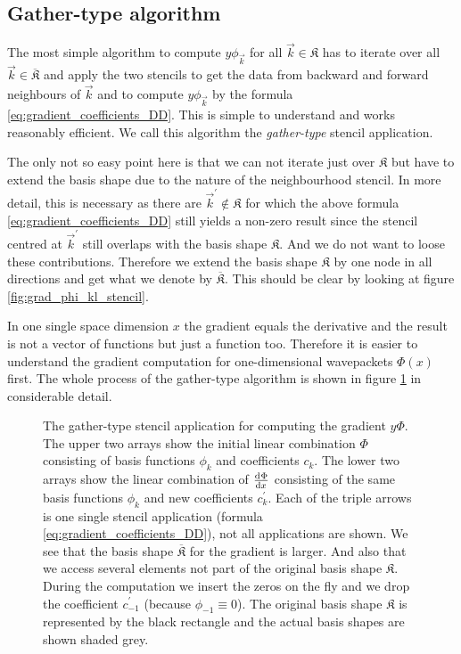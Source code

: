 \subsection{Gather-type algorithm}


The most simple algorithm to compute $y \phi_{\vec{k}}$ for all $\vec{k} \in \mathfrak{K}$
has to iterate over all $\vec{k} \in \overline{\mathfrak{K}}$ and apply the
two stencils to get the data from backward and forward neighbours of $\vec{k}$
and to compute $y \phi_{\vec{k}}$ by the formula \eqref{eq:gradient_coefficients_DD}.
This is simple to understand and works reasonably efficient. We call this algorithm the
\emph{gather-type} stencil application.

The only not so easy point here is that we can not iterate just over $\mathfrak{K}$
but have to extend the basis shape due to the nature of the neighbourhood stencil.
In more detail, this is necessary as there are $\vec{k}^\prime \notin \mathfrak{K}$
for which the above formula \eqref{eq:gradient_coefficients_DD} still yields a non-zero result since
the stencil centred at $\vec{k}^\prime$ still overlaps with the basis shape $\mathfrak{K}$.
And we do not want to loose these contributions. Therefore we extend the basis shape
$\mathfrak{K}$ by one node in all directions and get what we denote by $\overline{\mathfrak{K}}$.
This should be clear by looking at figure \ref{fig:grad_phi_kl_stencil}.

In one single space dimension $x$ the gradient equals the derivative and the result
is not a vector of functions but just a function too. Therefore it is easier to
understand the gradient computation for one-dimensional wavepackets $\Phi(x)$ first.
The whole process of the gather-type algorithm is shown in figure
\ref{fig:grad_phi_kl_gather_stencil_1D} in considerable detail.

\begin{figure}
  \centering
  
  \caption[Gather-type stencil in 1D] {The gather-type stencil application for
           computing the gradient $y\Phi$. The upper two arrays show the initial linear
           combination $\Phi$ consisting of basis functions $\phi_k$ and coefficients $c_k$.
           The lower two arrays show the linear combination of $\frac{\mathrm{d}^{}\Phi}{\mathrm{d}x^{}}$ consisting
           of the same basis functions $\phi_k$ and new coefficients $c_k^\prime$.
           Each of the triple arrows is one single stencil application (formula
           \eqref{eq:gradient_coefficients_DD}), not all applications are shown.
           We see that the basis shape $\overline{\mathfrak{K}}$ for the gradient
           is larger. And also that we access several elements not part of the original
           basis shape $\mathfrak{K}$. During the computation we insert the zeros
           on the fly and we drop the coefficient $c_{-1}^\prime$ (because $\phi_{-1} \equiv 0$).
           The original basis shape $\mathfrak{K}$ is represented by the black rectangle
           and the actual basis shapes are shown shaded grey.}
  \label{fig:grad_phi_kl_gather_stencil_1D}
\end{figure}


